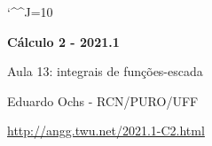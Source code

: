 \documentclass[oneside,12pt]{article}
\begin{document}
\catcode`\^^J=10

\pu

%
%

\def\drafturl{http://angg.twu.net/LATEX/2021-1-C2.pdf}
\def\drafturl{http://angg.twu.net/2021.1-C2.html}
\def\draftfooter{\tiny \href{\drafturl}{\jobname{}} \ColorBrown{\shorttoday{} \hours}}



%

\thispagestyle{empty}

\begin{center}

\vspace*{1.2cm}

{\bf \Large Cálculo 2 - 2021.1}

\bsk

Aula 13: integrais de funções-escada

\bsk

Eduardo Ochs - RCN/PURO/UFF

\url{http://angg.twu.net/2021.1-C2.html}

\end{center}

\newpage
\end{document}
